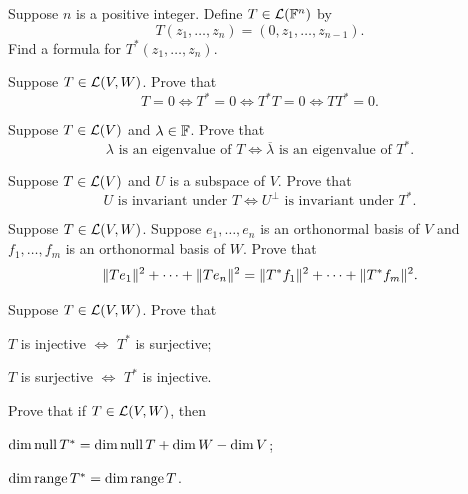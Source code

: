 \begin{exc}

\begin{exercise}
Suppose $n$ is a positive integer. Define $T\in\mathcal{L}(\mathbb{F}^n)$ by
\[ T(z_1,\dots,z_n) = (0,z_1,\dots,z_{n-1}). \]
Find a formula for $T^*(z_1,\dots,z_n)$.
\end{exercise}

\begin{exercise}
Suppose $T\in\mathcal{L}(V,W)$. Prove that
\[ T=0 \iff T^*=0 \iff T^*T=0 \iff TT^*=0. \]
\end{exercise}

\begin{exercise}
Suppose $T\in\mathcal{L}(V)$ and $\lambda\in\mathbb{F}$. Prove that
\[ \lambda \text{ is an eigenvalue of } T \iff \overline{\lambda} \text{ is an
   eigenvalue of } T^*. \]
\end{exercise}

\begin{exercise}
Suppose $T\in\mathcal{L}(V)$ and $U$ is a subspace of $V$. Prove that
\[ U \text{ is invariant under } T \iff U^\perp \text{ is invariant under }
   T^*. \]
\end{exercise}

\begin{exercise}
Suppose $T\in\mathcal{L}(V,W)$. Suppose $e_1,\dots,e_n$ is an orthonormal basis of $V$
and $f_1,\dots,f_m$ is an orthonormal basis of $W$. Prove that
\[ \lVert Te_1 \rVert^2+\cdots+\lVert Te_n \rVert^2 = \lVert T^*f_1 \rVert^2+\cdots+\lVert T^*f_m \rVert^2. \]
\end{exercise}

\begin{exercise}
Suppose $T\in\mathcal{L}(V,W)$. Prove that
\begin{parts}
\item $T$ is injective $\iff$ $T^*$ is surjective;
\item $T$ is surjective $\iff$ $T^*$ is injective.
\end{parts}
\end{exercise}

\begin{exercise}
Prove that if $T\in\mathcal{L}(V,W)$, then
\begin{parts}
\item $\operatorname{dim}\operatorname{null} T^*=\operatorname{dim}\operatorname{null} T+\operatorname{dim} W-\operatorname{dim} V$;
\item $\operatorname{dim}\operatorname{range} T^*=\operatorname{dim}\operatorname{range} T$.
\end{parts}
\end{exercise}


\end{exc}

